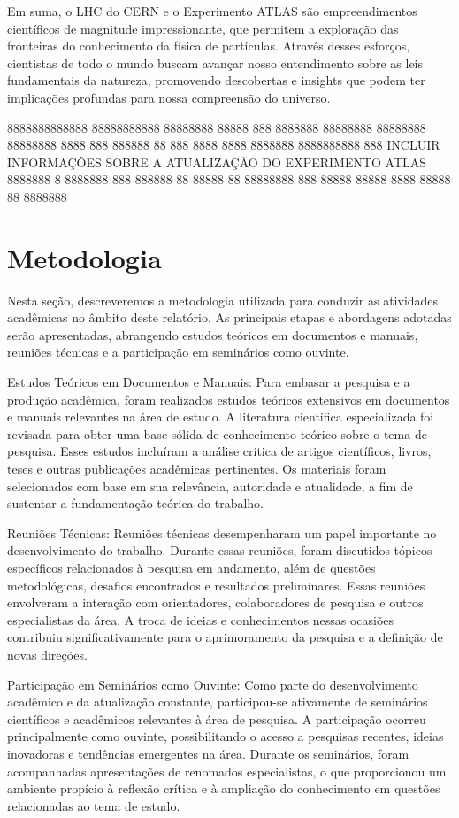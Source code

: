 Em suma, o LHC do CERN e o Experimento ATLAS são empreendimentos científicos de magnitude impressionante, que permitem a exploração das fronteiras do conhecimento da física de partículas. Através desses esforços, cientistas de todo o mundo buscam avançar nosso entendimento sobre as leis fundamentais da natureza, promovendo descobertas e insights que podem ter implicações profundas para nossa compreensão do universo.

8888888888888 88888888888 88888888 88888
888 8888888 88888888 88888888 88888888 8888 888 888888 88
888 8888 8888 8888888 8888888888 888
INCLUIR INFORMAÇÕES SOBRE A ATUALIZAÇÃO DO EXPERIMENTO ATLAS 8888888 8 8888888 888 888888 88 88888 88 88888888 888 88888 88888 8888 88888 88 8888888 

\section{Metodologia}\label{cap:metodo}

Nesta seção, descreveremos a metodologia utilizada para conduzir as atividades acadêmicas no âmbito deste relatório. As principais etapas e abordagens adotadas serão apresentadas, abrangendo estudos teóricos em documentos e manuais, reuniões técnicas e a participação em seminários como ouvinte.

Estudos Teóricos em Documentos e Manuais:
Para embasar a pesquisa e a produção acadêmica, foram realizados estudos teóricos extensivos em documentos e manuais relevantes na área de estudo. A literatura científica especializada foi revisada para obter uma base sólida de conhecimento teórico sobre o tema de pesquisa. Esses estudos incluíram a análise crítica de artigos científicos, livros, teses e outras publicações acadêmicas pertinentes. Os materiais foram selecionados com base em sua relevância, autoridade e atualidade, a fim de sustentar a fundamentação teórica do trabalho.

Reuniões Técnicas:
Reuniões técnicas desempenharam um papel importante no desenvolvimento do trabalho. Durante essas reuniões, foram discutidos tópicos específicos relacionados à pesquisa em andamento, além de questões metodológicas, desafios encontrados e resultados preliminares. Essas reuniões envolveram a interação com orientadores, colaboradores de pesquisa e outros especialistas da área. A troca de ideias e conhecimentos nessas ocasiões contribuiu significativamente para o aprimoramento da pesquisa e a definição de novas direções.

Participação em Seminários como Ouvinte:
Como parte do desenvolvimento acadêmico e da atualização constante, participou-se ativamente de seminários científicos e acadêmicos relevantes à área de pesquisa. A participação ocorreu principalmente como ouvinte, possibilitando o acesso a pesquisas recentes, ideias inovadoras e tendências emergentes na área. Durante os seminários, foram acompanhadas apresentações de renomados especialistas, o que proporcionou um ambiente propício à reflexão crítica e à ampliação do conhecimento em questões relacionadas ao tema de estudo.

